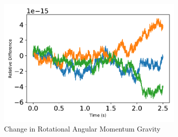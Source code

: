 \begin{figure}[htbp]\centerline{\includegraphics[width=0.8\textwidth]{AutoTeX/ChangeInRotationalAngularMomentumGravity}}\caption{Change in Rotational Angular Momentum Gravity}\label{fig:ChangeInRotationalAngularMomentumGravity}\end{figure}